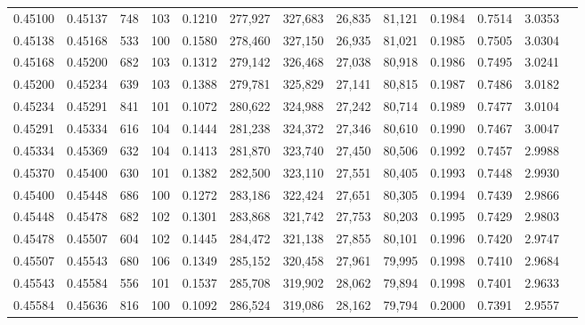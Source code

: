 \begin{tabular}{rrrrrrrrrrrrr}
0.45100 & 0.45137 &   748 & 103 &                                     0.1210 & 277,927 & 327,683 &  26,835 &  81,121 & 0.1984 & 0.7514 & 3.0353 \\
0.45138 & 0.45168 &   533 & 100 &                                     0.1580 & 278,460 & 327,150 &  26,935 &  81,021 & 0.1985 & 0.7505 & 3.0304 \\
0.45168 & 0.45200 &   682 & 103 &                                     0.1312 & 279,142 & 326,468 &  27,038 &  80,918 & 0.1986 & 0.7495 & 3.0241 \\
0.45200 & 0.45234 &   639 & 103 &                                     0.1388 & 279,781 & 325,829 &  27,141 &  80,815 & 0.1987 & 0.7486 & 3.0182 \\
0.45234 & 0.45291 &   841 & 101 &                                     0.1072 & 280,622 & 324,988 &  27,242 &  80,714 & 0.1989 & 0.7477 & 3.0104 \\
0.45291 & 0.45334 &   616 & 104 &                                     0.1444 & 281,238 & 324,372 &  27,346 &  80,610 & 0.1990 & 0.7467 & 3.0047 \\
0.45334 & 0.45369 &   632 & 104 &                                     0.1413 & 281,870 & 323,740 &  27,450 &  80,506 & 0.1992 & 0.7457 & 2.9988 \\
0.45370 & 0.45400 &   630 & 101 &                                     0.1382 & 282,500 & 323,110 &  27,551 &  80,405 & 0.1993 & 0.7448 & 2.9930 \\
0.45400 & 0.45448 &   686 & 100 &                                     0.1272 & 283,186 & 322,424 &  27,651 &  80,305 & 0.1994 & 0.7439 & 2.9866 \\
0.45448 & 0.45478 &   682 & 102 &                                     0.1301 & 283,868 & 321,742 &  27,753 &  80,203 & 0.1995 & 0.7429 & 2.9803 \\
0.45478 & 0.45507 &   604 & 102 &                                     0.1445 & 284,472 & 321,138 &  27,855 &  80,101 & 0.1996 & 0.7420 & 2.9747 \\
0.45507 & 0.45543 &   680 & 106 &                                     0.1349 & 285,152 & 320,458 &  27,961 &  79,995 & 0.1998 & 0.7410 & 2.9684 \\
0.45543 & 0.45584 &   556 & 101 &                                     0.1537 & 285,708 & 319,902 &  28,062 &  79,894 & 0.1998 & 0.7401 & 2.9633 \\
0.45584 & 0.45636 &   816 & 100 &                                     0.1092 & 286,524 & 319,086 &  28,162 &  79,794 & 0.2000 & 0.7391 & 2.9557 \\

\end{tabular}
